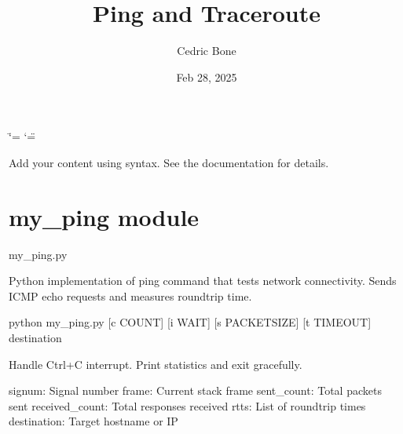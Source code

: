 \documentclass[letterpaper,10pt,english]{sphinxmanual}
\title{Ping and Traceroute}
\date{Feb 28, 2025}
\author{Cedric Bone}
\begin{document}
\ifdefined\shorthandoff
  \ifnum\catcode`\=\string=\active\shorthandoff{=}\fi
  \ifnum\catcode`\"=\active{}\fi
\fi

\pagestyle{empty}
\sphinxmaketitle
\pagestyle{plain}
\sphinxtableofcontents
\pagestyle{normal}
\label{\detokenize{index::doc}}


\sphinxAtStartPar
Add your content using  syntax. See the
documentation for details.

\sphinxstepscope


\chapter{my\_ping module}
\label{\detokenize{my_ping:module-my_ping}}\label{\detokenize{my_ping:my-ping-module}}\label{\detokenize{my_ping::doc}}
\sphinxAtStartPar
my\_ping.py

\sphinxAtStartPar
Python implementation of ping command that tests network connectivity.
Sends ICMP echo requests and measures round\sphinxhyphen{}trip time.
\begin{description}
\sphinxAtStartPar
python my\_ping.py {[}\sphinxhyphen{}c COUNT{]} {[}\sphinxhyphen{}i WAIT{]} {[}\sphinxhyphen{}s PACKETSIZE{]} {[}\sphinxhyphen{}t TIMEOUT{]} destination

\end{description}

\begin{fulllineitems}
\label{\detokenize{my_ping:my_ping.handle_interrupt}}
\pysigstartsignatures
\pysiglinewithargsret
{}
{\sphinxparamcomma {}\sphinxparamcomma {}\sphinxparamcomma {}\sphinxparamcomma {}\sphinxparamcomma {}}
{}
\pysigstopsignatures
\sphinxAtStartPar
Handle Ctrl+C interrupt.
Print statistics and exit gracefully.
\begin{description}
\sphinxAtStartPar
signum: Signal number
frame: Current stack frame
sent\_count: Total packets sent
received\_count: Total responses received
rtts: List of round\sphinxhyphen{}trip times
destination: Target hostname or IP

\end{description}

\end{fulllineitems}
\end{document}
